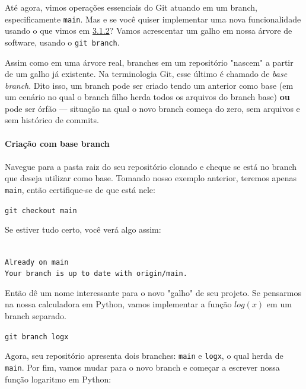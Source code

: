 \documentclass{article}
\begin{document}
  Até agora, vimos operações essenciais do Git atuando em um branch, especificamente \texttt{main}. Mas e se você quiser 
  implementar uma nova funcionalidade usando o que vimos em \href{sec:branches}{3.1.2}? Vamos acrescentar um galho em nossa 
  árvore de software, usando o \texttt{git branch}. 
  
  Assim como em uma árvore real, branches em um repositório "nascem" a partir de um galho já existente. Na terminologia Git, 
  esse último é chamado de \textit{base branch}. Dito isso, um branch pode ser criado tendo um anterior como base (em um cenário 
  no qual o branch filho herda todos os arquivos do branch base) \textbf{ou} pode ser órfão --- situação na qual o novo branch 
  começa do zero, sem arquivos e sem histórico de commits. 

  \paragraph{Criação com base branch}
  \paragraph{}

  Navegue para a pasta raiz do seu repositório clonado e cheque se está no branch que deseja utilizar como base. Tomando nosso 
  exemplo anterior, teremos apenas \texttt{main}, então certifique-se de que está nele: 

  \vspace{1ex}
  \texttt{git checkout main}
  \vspace{1ex}

  Se estiver tudo certo, você verá algo assim: 


  \texttt{\\ \noindent Already on \textquotesingle\!main\textquotesingle\! \\ \noindent Your branch is up to date with \textquotesingle\!origin/main\textquotesingle\!.}

  Então dê um nome interessante para o novo "galho" de seu projeto. Se pensarmos na nossa calculadora em Python, vamos
  implementar a função $ log(x) $ em um branch separado. 

  \vspace{1ex}
  \texttt{git branch logx}
  \vspace{1ex}

  Agora, seu repositório apresenta dois branches: \texttt{main} e \texttt{logx}, o qual herda de \texttt{main}. 
  Por fim, vamos mudar para o novo branch e começar a escrever nossa função logaritmo em Python: 
  
\end{document}
